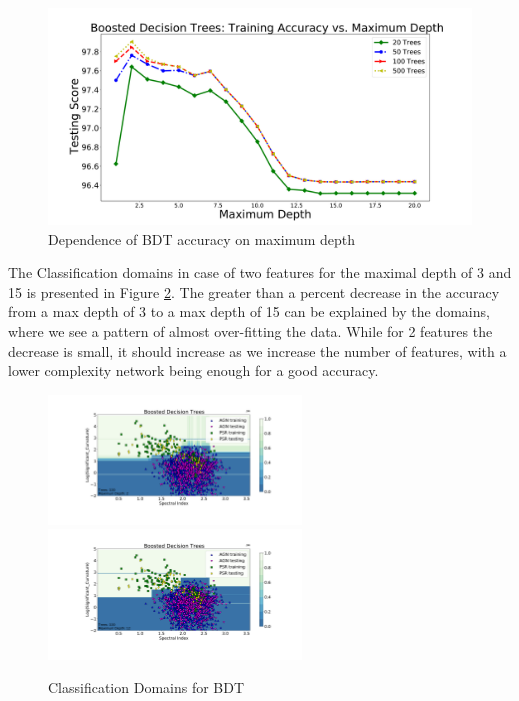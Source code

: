 \begin{figure}[h]
\includegraphics[width=\twopicsp\textwidth]{plots/bdt_train.pdf}
\caption{Dependence of BDT accuracy on maximum depth}
\label{fig:BDT_depth}
\end{figure}

The Classification domains in case of two features for the maximal depth of 3 and 15 is presented in Figure \ref{fig:BDT_domains}. The greater than a percent decrease in the accuracy from a max depth of 3 to a max depth of 15 can be explained by the domains, where we see a pattern of almost over-fitting the data. While for 2 features the decrease is small, it should increase as we increase the number of features, with a lower complexity network being enough for a good accuracy.

\begin{figure}[h]
\hspace*{-1.5cm}
\includegraphics[width=0.6\textwidth]{plots/classification_domains/bdt_100_2.pdf}
\hspace*{-1.5cm}
\includegraphics[width=0.6\textwidth]{plots/classification_domains/bdt_100_12.pdf}
\caption{Classification Domains for BDT}
\label{fig:BDT_domains}
\end{figure}


